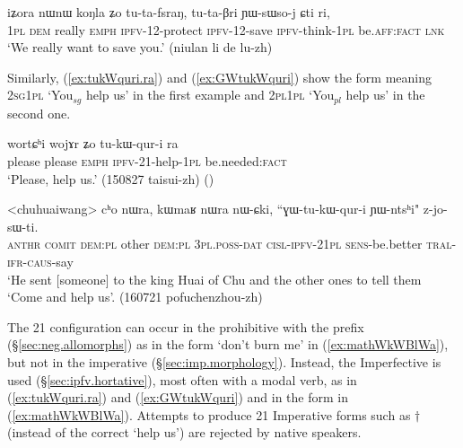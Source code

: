 \begin{exe}
\ex   \label{ex:iZora.tutafsraN}
\gll  iʑora nɯnɯ koŋla ʑo tu-ta-fsraŋ, tu-ta-βri ɲɯ-sɯso-j ɕti ri, \\
\textsc{1pl} \textsc{dem} really \textsc{emph} \textsc{ipfv}-1\fl{}2-protect \textsc{ipfv}-1\fl{}2-save \textsc{ipfv}-think-\textsc{1pl} be.\textsc{aff}:\textsc{fact} \textsc{lnk} \\ 
\glt `We really want to save you.' (niulan li de lu-zh)
\end{exe}

Similarly, (\ref{ex:tukWquri.ra}) and (\ref{ex:GWtukWquri}) show the form  meaning \textsc{2sg}\fl{}\textsc{1pl} `You$_{sg}$ help us' in the first example and \textsc{2pl}\fl{}\textsc{1pl} `You$_{pl}$ help us' in the second one.

\begin{exe}
\ex   \label{ex:tukWquri.ra}
\gll   wortɕʰi wojɤr ʑo tu-kɯ-qur-i ra \\
please please \textsc{emph} \textsc{ipfv}-2\fl{}1-help-\textsc{1pl} be.needed:\textsc{fact} \\
\glt `Please, help us.' (150827 taisui-zh)
()
\end{exe}

\begin{exe}
\ex   \label{ex:GWtukWquri}
\gll  <chuhuaiwang> cʰo nɯra, kɯmaʁ nɯra nɯ-ɕki, ``ɣɯ-tu-kɯ-qur-i ɲɯ-ntsʰi" z-jo-sɯ-ti. \\
\textsc{anthr} \textsc{comit} \textsc{dem}:\textsc{pl} other \textsc{dem}:\textsc{pl} \textsc{3pl}.\textsc{poss}-\textsc{dat} \textsc{cisl}-\textsc{ipfv}-2\fl{}\textsc{1pl} \textsc{sens}-be.better \textsc{tral}-\textsc{ifr}-\textsc{caus}-say \\
\glt `He sent [someone] to the king Huai of Chu and the other ones to tell them `Come and help us'. (160721 pofuchenzhou-zh)
\end{exe}

The 2\fl{}1 configuration can occur in the prohibitive with the prefix  (§\ref{sec:neg.allomorphs}) as in the form  `don't burn me' in (\ref{ex:mathWkWBlWa}), but not in the imperative (§\ref{sec:imp.morphology}). Instead, the Imperfective is used (§\ref{sec:ipfv.hortative}), most often with a modal verb, as in (\ref{ex:tukWquri.ra}) and (\ref{ex:GWtukWquri}) and in the form  in (\ref{ex:mathWkWBlWa}). Attempts to produce 2\fl{}1 Imperative forms such as $\dagger$ (instead of the correct  `help us') are rejected by native speakers.

